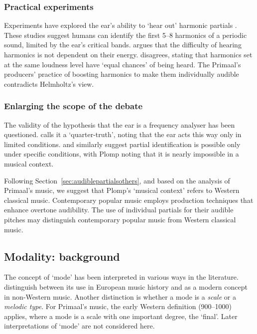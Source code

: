 \documentclass{article}
\begin{document}
\subsubsection{Practical experiments}

Experiments have explored the ear's ability to `hear out' harmonic partials \citep[pp.~86--88]{moore2012introduction}. These studies suggest humans can identify the first 5--8 harmonics of a periodic sound, limited by the ear's critical bands. \citet[p.~58]{helmoltz1885sensations} argues that the difficulty of hearing harmonics is not dependent on their energy. \citet{plomp1964ear} disagrees, stating that harmonics set at the same loudness level have `equal chances' of being heard. The Primaal's producers' practice of boosting harmonics to make them individually audible contradicts Helmholtz's view.



\subsubsection{Enlarging the scope of the debate}\label{sec:enlargingdebate}

The validity of the hypothesis that the ear is a frequency analyser has been questioned. \citet[p.~438]{dixonward1970} calls it a `quarter-truth', noting that the ear acts this way only in limited conditions. \citet{turner1977ohm} and \citet[p.~2]{plomp1976aspects} similarly suggest partial identification is possible only under specific conditions, with Plomp noting that it is nearly impossible in a musical context. 

Following Section~\ref{sec:audiblepartialsothers}, and based on the analysis of Primaal's music, we suggest that Plomp's `musical context' refers to Western classical music. Contemporary popular music employs production techniques that enhance overtone audibility. The use of individual partials for their audible pitches may distinguish contemporary popular music from Western classical music.


\subsection{Modality: background}\label{sec:modalitybackground}


The concept of `mode' has been interpreted in various ways in the literature. \citet{powers2001mode} distinguish between its use in European music history and as a modern concept in non-Western music. Another distinction is whether a mode is a \emph{scale} or a \emph{melodic type}. For Primaal's music, the early Western definition (900--1000) applies, where a mode is a scale with one important degree, the `final'. Later interpretations of `mode' are not considered here.
\end{document}
